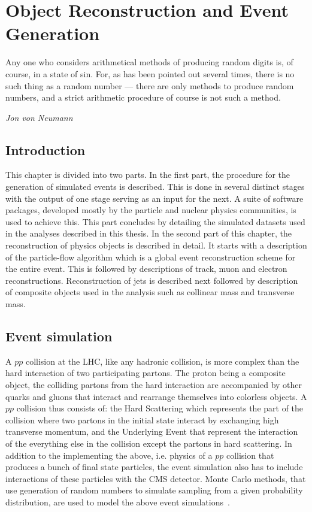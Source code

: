 \chapter{Object Reconstruction and Event Generation}
\label{chap:event_sim}
\epigraph{Any one who considers arithmetical methods of producing random digits is, of course, in a state of sin. For, as has been pointed out several times, there is no such thing as a random number --- there are only methods to produce random numbers, and a strict arithmetic procedure of course is not such a method.}{\textit{Jon von Neumann}}
\vskip 0.5in
\section{Introduction}
\label{intro}
This chapter is divided into two parts. In the first part, the procedure for the generation of simulated events is described. This is done in several distinct stages with the output of one stage serving as an input for the next. A suite of software packages, developed mostly by the particle and nuclear physics communities, is used to achieve this. This part concludes by detailing the simulated datasets used in the analyses described in this thesis. In the second part of this chapter, the reconstruction of physics objects is described in detail. It starts with a description of the particle-flow algorithm which is a global event reconstruction scheme for the entire event. This is followed by descriptions of track, muon and electron reconstructions. Reconstruction of jets is described next followed by description of composite objects used in the analysis such as collinear mass and transverse mass.
 

\section{Event simulation}
A $pp$ collision at the LHC, like any hadronic collision, is more complex than the hard interaction of two participating partons. The proton being a composite object, the colliding partons from the hard interaction are accompanied by other quarks and gluons that interact and rearrange themselves into colorless objects. A $pp$ collision thus consists of: the Hard Scattering which represents the part of the collision where two partons in the initial state interact by exchanging high transverse momentum, and the Underlying Event that represent the interaction of the everything else in the collision except the partons in hard scattering. In addition to the implementing the above, i.e. physics of a $pp$ collision  that produces a bunch of final state particles, the event simulation also has to include interactions of these particles with the CMS detector. Monte Carlo methods, that use generation of random numbers to simulate sampling from a given probability distribution, are used to model the above event simulations~\cite{mc_evtsim}.

